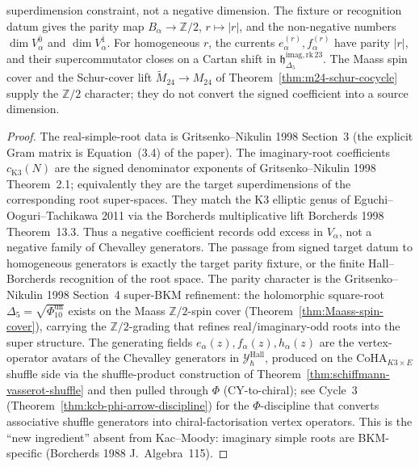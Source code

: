 \begin{theorem}
\begin{enumerate}[label=\textup{(\roman*)}]
superdimension constraint, not a negative dimension. The fixture or
recognition datum gives the parity map
$B_\alpha\to\mathbb{Z}/2$, $r\mapsto |r|$, and the non-negative numbers
$\dim V_\alpha^{\overline{0}}$ and $\dim V_\alpha^{\overline{1}}$. For
homogeneous $r$, the currents $e^{(r)}_\alpha,f^{(r)}_\alpha$ have parity
${|r|}$, and their supercommutator closes on a Cartan shift in
$\mathfrak{h}^{\mathrm{imag,rk\,23}}_{\Delta_5}$. The Maass spin cover
and the Schur-cover lift $\widetilde{M}_{24}\to M_{24}$ of
Theorem~\ref{thm:m24-schur-cocycle} supply the $\mathbb{Z}/2$ character;
they do not convert the signed coefficient into a source dimension.
\end{enumerate}
\end{theorem}

\begin{proof}
The real-simple-root data is Gritsenko--Nikulin 1998 Section~3 (the
explicit Gram matrix is Equation~(3.4) of the paper). The
imaginary-root coefficients $c_{\mathrm{K3}}(N)$ are the signed
denominator exponents of Gritsenko--Nikulin 1998 Theorem~2.1; equivalently
they are the target superdimensions of the corresponding root
super-spaces. They match the K3 elliptic genus of
Eguchi--Ooguri--Tachikawa 2011 via the Borcherds multiplicative lift
Borcherds 1998 Theorem~13.3. Thus a negative coefficient records odd
excess in $V_\alpha$, not a negative family of Chevalley generators. The
passage from signed target datum to homogeneous generators is exactly the
target parity fixture, or the finite Hall--Borcherds recognition of the
root space. The parity character is the Gritsenko--Nikulin 1998 Section~4
super-BKM refinement: the
holomorphic square-root \(\Delta_5=\sqrt{\Phi_{10}^{\mathrm{un}}}\) exists on the
Maass $\mathbb{Z}/2$-spin cover
(Theorem~\ref{thm:Maass-spin-cover}), carrying the $\mathbb{Z}/2$-grading
that refines real/imaginary-odd roots into the super structure. The
generating fields $e_\alpha(z), f_\alpha(z), h_\alpha(z)$ are the
vertex-operator avatars of the Chevalley generators in
$\mathcal{Y}^{\mathrm{Hall}}_\hbar$, produced on the
$\mathrm{CoHA}_{K3\times E}$ shuffle side via the shuffle-product
construction of Theorem~\ref{thm:schiffmann-vasserot-shuffle} and then
pulled through $\Phi$ (CY-to-chiral); see
Cycle~$3$ (Theorem~\ref{thm:kcb-phi-arrow-discipline}) for the
$\Phi$-discipline that converts associative shuffle generators into
chiral-factorisation vertex operators. This is the ``new ingredient''
absent from Kac--Moody: imaginary simple roots are BKM-specific
(Borcherds 1988 \textup{J.~Algebra}~115).
\end{proof}

